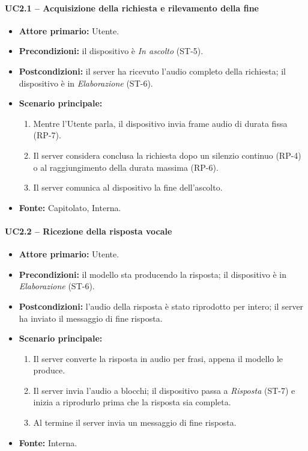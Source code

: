\documentclass[12pt,a4paper]{article}
\newcommand{\tightlist}{\setlength{\itemsep}{1pt}\setlength{\parskip}{0pt}}
\begin{document}
\paragraph{UC2.1 -- Acquisizione della richiesta e rilevamento della fine}
\begin{itemize}
\tightlist
\item \textbf{Attore primario:} Utente.
\item \textbf{Precondizioni:} il dispositivo è \emph{In ascolto} (ST-5).
\item \textbf{Postcondizioni:} il server ha ricevuto l'audio completo della richiesta; il dispositivo è in \emph{Elaborazione} (ST-6).
\item \textbf{Scenario principale:}
\begin{enumerate}
\tightlist
\item Mentre l'Utente parla, il dispositivo invia frame audio di durata fissa (RP-7).
\item Il server considera conclusa la richiesta dopo un silenzio continuo (RP-4) o al raggiungimento della durata massima (RP-6).
\item Il server comunica al dispositivo la fine dell'ascolto.
\end{enumerate}
\item \textbf{Fonte:} Capitolato, Interna.
\end{itemize}

\paragraph{UC2.2 -- Ricezione della risposta vocale}
\begin{itemize}
\tightlist
\item \textbf{Attore primario:} Utente.
\item \textbf{Precondizioni:} il modello sta producendo la risposta; il dispositivo è in \emph{Elaborazione} (ST-6).
\item \textbf{Postcondizioni:} l'audio della risposta è stato riprodotto per intero; il server ha inviato il messaggio di fine risposta.
\item \textbf{Scenario principale:}
\begin{enumerate}
\tightlist
\item Il server converte la risposta in audio per frasi, appena il modello le produce.
\item Il server invia l'audio a blocchi; il dispositivo passa a \emph{Risposta} (ST-7) e inizia a riprodurlo prima che la risposta sia completa.
\item Al termine il server invia un messaggio di fine risposta.
\end{enumerate}
\item \textbf{Fonte:} Interna.
\end{itemize}
\end{document}
